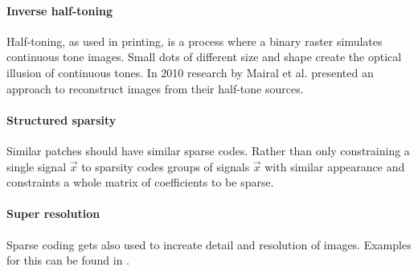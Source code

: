 \paragraph{Inverse half-toning} Half-toning, as used in printing, is a process
where a binary raster simulates continuous tone images. Small dots of different
size and shape create the optical illusion of continuous tones. In 2010 research
by Mairal et al.\cite{Mairal2010b} presented an approach to reconstruct images
from their half-tone sources.

\paragraph{Structured sparsity} Similar patches should have similar sparse
codes. Rather than only constraining a single signal $\vec{x}$ to sparsity
\cite{group_sparsity} codes groups of signals $\vec{x}$ with similar appearance
and constraints a whole matrix of coefficients to be sparse.

\paragraph{Super resolution} Sparse coding gets also used to increate detail and
resolution of images. Examples for this can be found in
\cite{Wright2008,Yang2010,Yang2010}.







